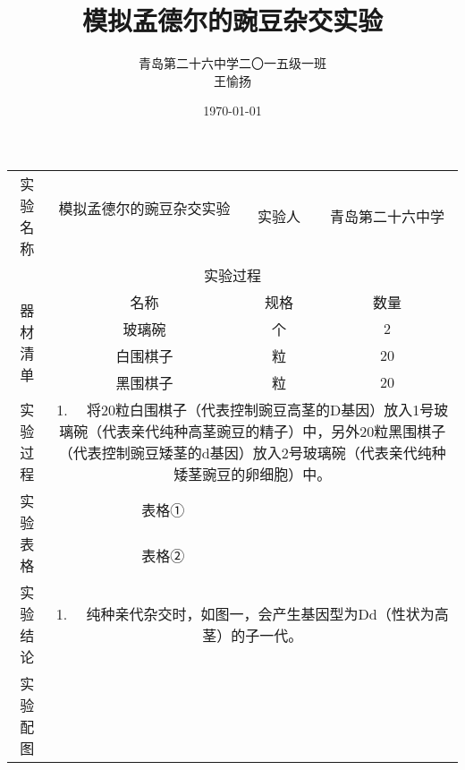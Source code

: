 \documentclass[11pt,a4paper,titlepage,twocolumn]{ctexart}
\title{\textbf{{\huge 模拟孟德尔的豌豆杂交实验}}}
\author{青岛第二十六中学\quad 二〇一五级一班\\王愉扬}
\date{\today}
\begin{document}
	\maketitle
	
	\begin{tabular}{|c|c|c|c|c|c|}
		\hline
		\multirow{3}[2]{*}{实验名称} & \multirow{2}[1]{*}{模拟孟德尔的豌豆杂交实验} & \multicolumn{2}{c|}{\multirow{3}[2]{*}{实验人}} & \multicolumn{2}{c|}{\multirow{3}[2]{*}{青岛第二十六中学}} \bigstrut[t]\\
		&   & \multicolumn{2}{c|}{} & \multicolumn{2}{c|}{} \\
		&   & \multicolumn{2}{c|}{} & \multicolumn{2}{c|}{} \bigstrut[b]\\
		\hline
		\multicolumn{6}{|c|}{实验过程} \bigstrut\\
		\hline
		\multirow{4}[8]{*}{器材清单} & 名称 & \multicolumn{3}{c|}{规格} & 数量 \bigstrut\\
		\cline{2-6}  & 玻璃碗 & \multicolumn{3}{c|}{个} & 2 \bigstrut\\
		\cline{2-6}  & 白围棋子 & \multicolumn{3}{c|}{粒} & 20 \bigstrut\\
		\cline{2-6}  & 黑围棋子 & \multicolumn{3}{c|}{粒} & 20 \bigstrut\\
		\hline
		\multirow{6}[2]{*}{实验过程} & \multicolumn{5}{c|}{\multirow{6}[2]{30em}{1.   将20粒白围棋子（代表控制豌豆高茎的D基因）放入1号玻璃碗（代表亲代纯种高茎豌豆的精子）中，另外20粒黑围棋子（代表控制豌豆矮茎的d基因）放入2号玻璃碗（代表亲代纯种矮茎豌豆的卵细胞）中。}} \bigstrut[t]\\
		& \multicolumn{5}{c|}{} \\
		& \multicolumn{5}{c|}{} \\
		& \multicolumn{5}{c|}{} \\
		& \multicolumn{5}{c|}{} \\
		& \multicolumn{5}{c|}{} \bigstrut[b]\\
		\hline
		\multirow{2}[4]{*}{实验表格} & \multicolumn{2}{c|}{表格①} & \multicolumn{3}{r|}{} \bigstrut\\
		\cline{2-6}  & \multicolumn{2}{c|}{表格②} & \multicolumn{3}{r|}{} \bigstrut\\
		\hline
		\multirow{4}[2]{*}{实验结论} & \multicolumn{5}{c|}{\multirow{4}[2]{30em}{1.   纯种亲代杂交时，如图一，会产生基因型为Dd（性状为高茎）的子一代。}} \bigstrut[t]\\
		& \multicolumn{5}{c|}{} \\
		& \multicolumn{5}{c|}{} \\
		& \multicolumn{5}{c|}{} \bigstrut[b]\\
		\hline
		实验配图 & \multicolumn{5}{c|}{} \bigstrut\\
		\hline
	\end{tabular}%
	
	
\end{document}
